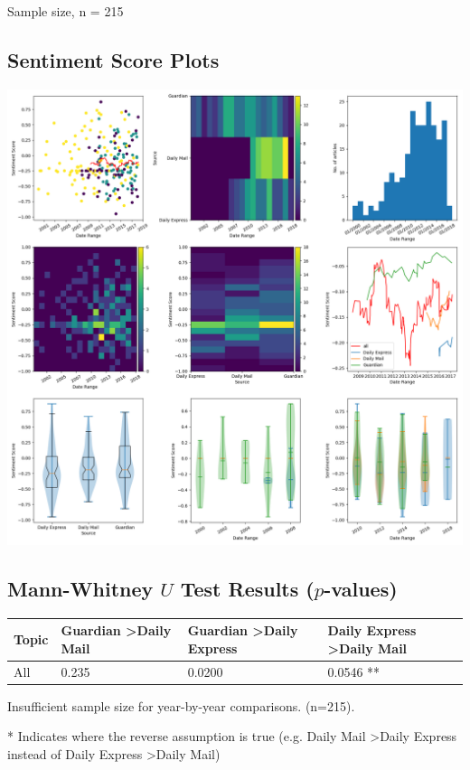 \documentclass{report}
\begin{document}
\noindent Sample size, n = 215

\subsection{Sentiment Score Plots}
\includegraphics[width=\textwidth]{raw/speech-impairment.png}

\subsection{Mann-Whitney $U$ Test Results ($p$-values)}
\noindent
\begin{tabu} to 1.0\textwidth { | X[c] | X[c] | X[c] | X[c] | }
	\hline
	Topic & Guardian \textgreater\space Daily Mail & Guardian \textgreater\space Daily Express & Daily Express \textgreater\space Daily Mail  \\
	\hline
	All & 0.235 & 0.0200 & 0.0546 **  \\
	\hline
\end{tabu}

\noindent Insufficient sample size for year-by-year comparisons. (n=215).

\noindent ** Indicates where the reverse assumption is true (e.g. Daily Mail \textgreater\space Daily Express instead of Daily Express \textgreater\space Daily Mail)
\end{document}
